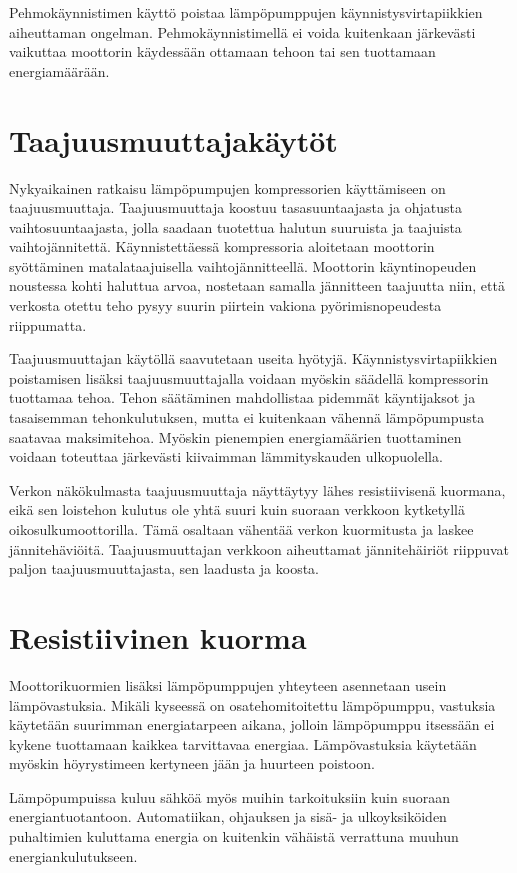   Pehmokäynnistimen käyttö poistaa lämpöpumppujen käynnistysvirtapiikkien aiheuttaman ongelman. Pehmokäynnistimellä ei voida kuitenkaan järkevästi vaikuttaa moottorin käydessään ottamaan tehoon tai sen tuottamaan energiamäärään.

\section{Taajuusmuuttajakäytöt}
  Nykyaikainen ratkaisu lämpöpumpujen kompressorien käyttämiseen on taajuusmuuttaja. Taajuusmuuttaja koostuu tasasuuntaajasta ja ohjatusta vaihtosuuntaajasta, jolla saadaan tuotettua halutun suuruista ja taajuista vaihtojännitettä. Käynnistettäessä kompressoria aloitetaan moottorin syöttäminen matalataajuisella vaihtojännitteellä. Moottorin käyntinopeuden noustessa kohti haluttua arvoa, nostetaan samalla jännitteen taajuutta niin, että verkosta otettu teho pysyy suurin piirtein vakiona pyörimisnopeudesta riippumatta.

  Taajuusmuuttajan käytöllä saavutetaan useita hyötyjä. Käynnistysvirtapiikkien poistamisen lisäksi taajuusmuuttajalla voidaan myöskin säädellä kompressorin tuottamaa tehoa. Tehon säätäminen mahdollistaa pidemmät käyntijaksot ja tasaisemman tehonkulutuksen, mutta ei kuitenkaan vähennä lämpöpumpusta saatavaa maksimitehoa. Myöskin pienempien energiamäärien tuottaminen voidaan toteuttaa järkevästi kiivaimman lämmityskauden ulkopuolella.

  Verkon näkökulmasta taajuusmuuttaja näyttäytyy lähes resistiivisenä kuormana, eikä sen loistehon kulutus ole yhtä suuri kuin suoraan verkkoon kytketyllä oikosulkumoottorilla. Tämä osaltaan vähentää verkon kuormitusta ja laskee jännitehäviöitä. Taajuusmuuttajan verkkoon aiheuttamat jännitehäiriöt riippuvat paljon taajuusmuuttajasta, sen laadusta ja koosta.

\section{Resistiivinen kuorma}
  Moottorikuormien lisäksi lämpöpumppujen yhteyteen asennetaan usein lämpövastuksia. Mikäli kyseessä on osatehomitoitettu lämpöpumppu, vastuksia käytetään suurimman energiatarpeen aikana, jolloin lämpöpumppu itsessään ei kykene tuottamaan kaikkea tarvittavaa energiaa. Lämpövastuksia käytetään myöskin höyrystimeen kertyneen jään ja huurteen poistoon.

  Lämpöpumpuissa kuluu sähköä myös muihin tarkoituksiin kuin suoraan energiantuotantoon. Automatiikan, ohjauksen ja sisä- ja ulkoyksiköiden puhaltimien kuluttama energia on kuitenkin vähäistä verrattuna muuhun energiankulutukseen.
